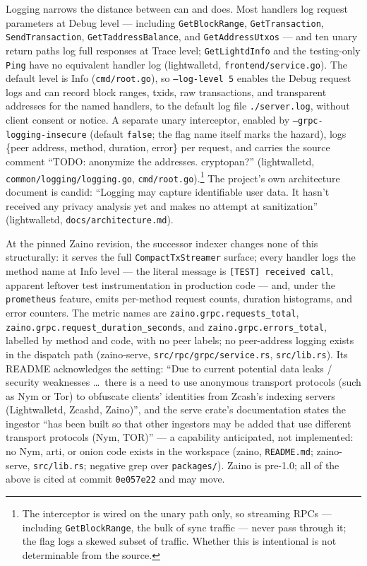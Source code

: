 \documentclass[11pt,a4paper]{article}
\theoremstyle{definition}
\begin{document}
Logging narrows the distance between can and does. Most handlers log request
parameters at Debug level --- including \texttt{GetBlockRange},
\texttt{GetTransaction}, \texttt{SendTransaction},
\texttt{GetTaddressBalance}, and \texttt{GetAddressUtxos} --- and ten unary
return paths log full responses at Trace level; \texttt{GetLightdInfo} and
the testing-only \texttt{Ping} have no equivalent handler log
(\textsf{lightwalletd}, \texttt{frontend/service.go}). The default level is
Info (\texttt{cmd/root.go}), so \texttt{--log-level 5} enables the Debug
request logs and can record block ranges, txids, raw transactions, and
transparent addresses for the named handlers, to the default log file
\texttt{./server.log}, without client consent or notice. A separate unary
interceptor, enabled by
\texttt{--grpc-logging-insecure} (default \texttt{false}; the flag name
itself marks the hazard), logs \{peer address, method, duration, error\}
per request, and carries the source comment ``TODO: anonymize the
addresses. cryptopan?'' (\textsf{lightwalletd},
\texttt{common/logging/logging.go},
\texttt{cmd/root.go}).\footnote{The interceptor is wired on the unary path
only, so streaming RPCs --- including \texttt{GetBlockRange}, the bulk of
sync traffic --- never pass through it; the flag logs a skewed subset of
traffic. Whether this is intentional is not determinable from the source.}
The project's own architecture document is candid: ``Logging may capture
identifiable user data. It hasn't received any privacy analysis yet and
makes no attempt at sanitization'' (\textsf{lightwalletd},
\texttt{docs/architecture.md}).

At the pinned Zaino revision, the successor indexer changes none of this
structurally: it serves
the full \texttt{CompactTx}\allowbreak\texttt{Streamer} surface; every
handler logs the method
name
at Info level --- the literal message is \texttt{[TEST] received call},
apparent leftover test instrumentation in production code --- and, under
the \texttt{prometheus} feature, emits per-method request counts, duration
histograms, and error counters. The metric names are
\texttt{zaino.grpc.requests\_total},
\texttt{zaino.grpc.request\_duration\_seconds}, and
\texttt{zaino.grpc.errors\_total}, labelled by method and code, with no
peer labels; no peer-address logging exists in the dispatch path
(\textsf{zaino-serve}, \texttt{src/rpc/grpc/service.rs},
\texttt{src/lib.rs}). Its README acknowledges the
setting: ``Due to current potential data leaks / security weaknesses
\ldots\ there is a need to use anonymous transport protocols (such as Nym
or Tor) to obfuscate clients' identities from Zcash's indexing servers
(Lightwalletd, Zcashd, Zaino)'', and the serve crate's documentation states
the ingestor ``has been built so that other ingestors may be added that use
different transport protocols (Nym, TOR)'' --- a capability anticipated,
not implemented: no Nym, arti, or onion code exists in the workspace
(\textsf{zaino}, \texttt{README.md}; \textsf{zaino-serve},
\texttt{src/lib.rs}; negative grep over \texttt{packages/}). Zaino is
pre-1.0; all of the above
is cited at commit \texttt{0e057e22} and may move.
\end{document}
